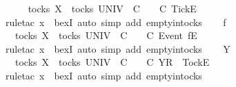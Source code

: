 \isamarkupfalse%
\isanewline
\ \ \isamarkupfalse%
\ {\isachardoublequoteopen}{\isacharbrackleft}{\isacharbrackright}\ {\isasymin}\ tocks\ X\ {\isasymLongrightarrow}\ {\isasymexists}{\isasymrho}{\isasymin}tocks\ UNIV{\isachardot}\ {\isacharbrackleft}{\isacharbrackright}\ {\isasymsubseteq}\isactrlsub C\ {\isasymrho}\ {\isasymand}\ {\isasymrho}\ {\isasymle}\isactrlsub C\ {\isacharbrackleft}{\isacharbrackleft}Tick{\isacharbrackright}\isactrlsub E{\isacharbrackright}{\isachardoublequoteclose}\ \ \isanewline
\ \ \ \ \isamarkupfalse%
\ {\isacharparenleft}rule{\isacharunderscore}tac\ x{\isacharequal}{\isachardoublequoteopen}{\isacharbrackleft}{\isacharbrackright}{\isachardoublequoteclose}\ \ bexI{\isacharcomma}\ auto\ simp\ add{\isacharcolon}\ empty{\isacharunderscore}in{\isacharunderscore}tocks{\isacharparenright}\isanewline
{}\isamarkupfalse%
\isanewline
\ \ \isamarkupfalse%
\ f\ {\isasymsigma}\isanewline
\ \ \isamarkupfalse%
\ {\isachardoublequoteopen}{\isacharbrackleft}{\isacharbrackright}\ {\isasymin}\ tocks\ X\ {\isasymLongrightarrow}\ {\isasymexists}{\isasymrho}{\isasymin}tocks\ UNIV{\isachardot}\ {\isacharbrackleft}{\isacharbrackright}\ {\isasymsubseteq}\isactrlsub C\ {\isasymrho}\ {\isasymand}\ {\isasymrho}\ {\isasymle}\isactrlsub C\ {\isacharbrackleft}Event\ f{\isacharbrackright}\isactrlsub E\ {\isacharhash}\ {\isasymsigma}{\isachardoublequoteclose}\isanewline
\ \ \ \ \isamarkupfalse%
\ {\isacharparenleft}rule{\isacharunderscore}tac\ x{\isacharequal}{\isachardoublequoteopen}{\isacharbrackleft}{\isacharbrackright}{\isachardoublequoteclose}\ \ bexI{\isacharcomma}\ auto\ simp\ add{\isacharcolon}\ empty{\isacharunderscore}in{\isacharunderscore}tocks{\isacharparenright}\isanewline
{}\isamarkupfalse%
\isanewline
\ \ \isamarkupfalse%
\ Y\ {\isasymsigma}\isanewline
\ \ \isamarkupfalse%
\ {\isachardoublequoteopen}{\isacharbrackleft}{\isacharbrackright}\ {\isasymin}\ tocks\ X\ {\isasymLongrightarrow}\ {\isasymexists}{\isasymrho}{\isasymin}tocks\ UNIV{\isachardot}\ {\isacharbrackleft}{\isacharbrackright}\ {\isasymsubseteq}\isactrlsub C\ {\isasymrho}\ {\isasymand}\ {\isasymrho}\ {\isasymle}\isactrlsub C\ {\isacharbrackleft}Y{\isacharbrackright}\isactrlsub R\ {\isacharhash}\ {\isacharbrackleft}Tock{\isacharbrackright}\isactrlsub E\ {\isacharhash}\ {\isasymsigma}{\isachardoublequoteclose}\isanewline
\ \ \ \ \isamarkupfalse%
\ {\isacharparenleft}rule{\isacharunderscore}tac\ x{\isacharequal}{\isachardoublequoteopen}{\isacharbrackleft}{\isacharbrackright}{\isachardoublequoteclose}\ \ bexI{\isacharcomma}\ auto\ simp\ add{\isacharcolon}\ empty{\isacharunderscore}in{\isacharunderscore}tocks{\isacharparenright}\isanewline
